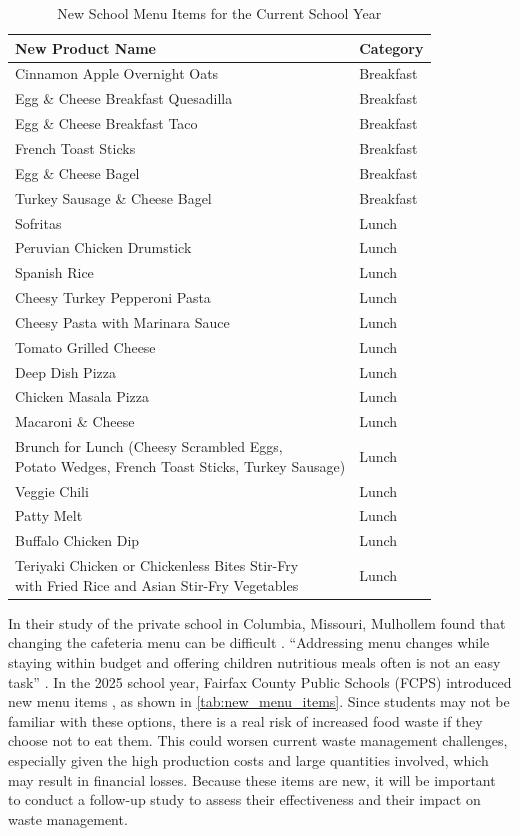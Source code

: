\documentclass[journal]{IEEEtran}
\begin{document}
\begin{table}[t]
  \centering
  \caption{New School Menu Items for the Current School Year}
  \label{tab:new_menu_items}
  \begin{tabularx}{\linewidth}{l X}
    \toprule
    \textbf{New Product Name} & \textbf{Category} \\
    \midrule
    Cinnamon Apple Overnight Oats & Breakfast \\
    Egg \& Cheese Breakfast Quesadilla & Breakfast \\
    Egg \& Cheese Breakfast Taco & Breakfast \\
    French Toast Sticks & Breakfast \\
    Egg \& Cheese Bagel & Breakfast \\
    Turkey Sausage \& Cheese Bagel & Breakfast \\
    \midrule
    Sofritas & Lunch \\
    Peruvian Chicken Drumstick & Lunch \\
    Spanish Rice & Lunch \\
    Cheesy Turkey Pepperoni Pasta & Lunch \\
    Cheesy Pasta with Marinara Sauce & Lunch \\
    Tomato Grilled Cheese & Lunch \\
    Deep Dish Pizza & Lunch \\
    Chicken Masala Pizza & Lunch \\
    Macaroni \& Cheese & Lunch \\
    \makecell[l]{Brunch for Lunch (Cheesy Scrambled Eggs, \\ \hspace{1em}Potato Wedges, French Toast Sticks, Turkey Sausage)} & Lunch \\
    Veggie Chili & Lunch \\
    Patty Melt & Lunch \\
    Buffalo Chicken Dip & Lunch \\
    \makecell[l]{Teriyaki Chicken or Chickenless Bites Stir-Fry \\ \hspace{1em}with Fried Rice and Asian Stir-Fry Vegetables} & Lunch \\
    \bottomrule
  \end{tabularx}
\end{table}

In their study of the private school in Columbia, Missouri, Mulhollem found that changing the cafeteria menu can be difficult \cite{mulhollem}. “Addressing menu changes while staying within budget and offering children nutritious meals often is not an easy task” \cite{mulhollem}. In the 2025 school year, Fairfax County Public Schools (FCPS) introduced new menu items \cite{fcpsfood}, as shown in \autoref{tab:new_menu_items}. Since students may not be familiar with these options, there is a real risk of increased food waste if they choose not to eat them. This could worsen current waste management challenges, especially given the high production costs and large quantities involved, which may result in financial losses. Because these items are new, it will be important to conduct a follow-up study to assess their effectiveness and their impact on waste management.
\end{document}
